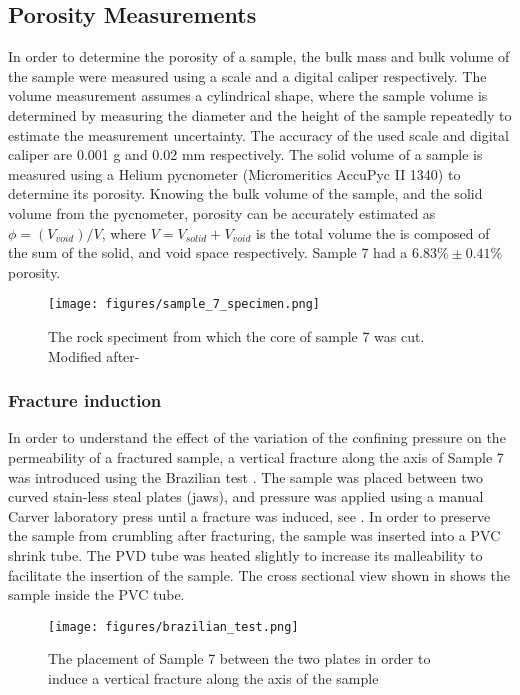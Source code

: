 \documentclass[12pt,titlepage]{article}
\begin{document}
\subsection{Porosity Measurements}
In order to determine the porosity of a sample, the bulk mass and bulk volume of the sample were measured using a scale and a digital caliper respectively. The volume measurement assumes a cylindrical shape, where the sample volume is determined by measuring the diameter and the height of the sample repeatedly to estimate the measurement uncertainty. The accuracy of the used scale and digital caliper are 0.001 g and 0.02 mm respectively. The solid volume of a sample is measured using a Helium pycnometer (Micromeritics AccuPyc II 1340) to determine its porosity. Knowing the bulk volume of the sample, and the solid volume from the pycnometer, porosity can be accurately estimated as $\phi = (V_{void})/V$, where $V = V_{solid} + V_{void}$ is the total volume the is composed of the sum of the solid, and void space respectively. Sample 7 had a $6.83\%\pm0.41\%$ porosity. 

\begin{figure}
\centering
\texttt{[image: figures/sample\_7\_specimen.png]}
\caption{The rock speciment from which the core of sample 7 was cut. Modified after- \cite[Figure 3]{Bland2022}}
\label{fig:sample_7_specimen}
\end{figure}

\subsubsection{Fracture induction}
In order to understand the effect of the variation of the confining pressure on the permeability of a fractured sample, a vertical fracture along the axis of Sample 7 was introduced using the Brazilian test . The sample was placed between two curved stain-less steal plates (jaws), and pressure was applied using a manual Carver laboratory press until a fracture was induced, see . In order to preserve the sample from crumbling after fracturing, the sample was inserted into a PVC shrink tube. The PVD tube was heated slightly to increase its malleability to facilitate the insertion of the sample. The cross sectional view shown in  shows the sample inside the PVC tube.

\begin{figure}
\centering
\texttt{[image: figures/brazilian\_test.png]}
\caption{The placement of Sample 7 between the two plates in order to induce a vertical fracture along the axis of the sample \citep[Figure 10]{Bland2022}}
\label{fig:brazilian_text}
\end{figure}
\end{document}
